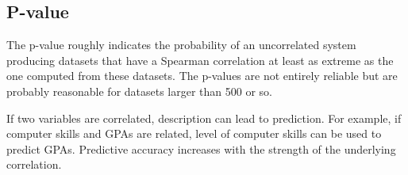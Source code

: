 \subsection{P-value}

The p-value roughly indicates the probability of an uncorrelated system producing datasets that have a Spearman correlation at least as extreme as the one computed from these datasets. The p-values are not entirely reliable but are probably reasonable for datasets larger than 500 or so.

If two variables are correlated, description can lead to prediction. For example, if computer skills and GPAs are related, level of computer skills can be used to predict GPAs. Predictive accuracy increases with the strength of the underlying correlation.


%
%






